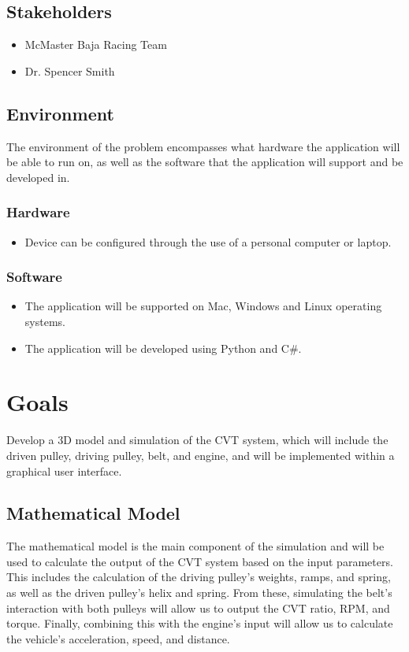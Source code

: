 \documentclass{article}
\begin{document}
\subsection{Stakeholders}
\begin{itemize}
    \item McMaster Baja Racing Team
    \item Dr. Spencer Smith
\end{itemize}

\subsection{Environment}
The environment of the problem encompasses what hardware the application will be able to run on,
as well as the software that the application will support and be developed in.

\subsubsection{Hardware}
\begin{itemize}
    \item Device can be configured through the use of a personal computer or laptop.
\end{itemize}
    \subsubsection{Software}
\begin{itemize}
    \item The application will be supported on Mac, Windows and Linux operating
    systems.
    \item The application will be developed using Python and C\#.
\end{itemize}

\section{Goals}

Develop a 3D model and simulation of the CVT system, which will include the driven pulley, 
driving pulley, belt, and engine, and will be implemented within a graphical user interface.

\subsection{Mathematical Model}
The mathematical model is the main component of the simulation and will be used to 
calculate the output of the CVT system based on the input parameters.
This includes the calculation of the driving pulley's weights, ramps, and spring, 
as well as the driven pulley's helix and spring.
From these, simulating the belt's interaction with both pulleys will allow us to output 
the CVT ratio, RPM, and torque. Finally, combining this with the engine's input
will allow us to calculate the vehicle's acceleration, speed, and distance.
\end{document}
